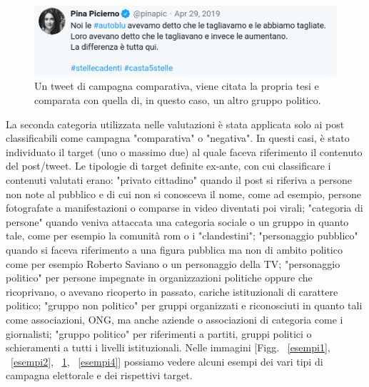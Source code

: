 \begin{figure}
	\includegraphics[width=\linewidth]{figures/comparativa}
	\caption{Un tweet di campagna comparativa, viene citata la propria tesi e comparata con quella di, in questo caso, un altro gruppo politico.}
	\label{esempi3}
\end{figure}
La seconda categoria utilizzata nelle valutazioni è stata applicata solo ai post classificabili come campagna "comparativa" o "negativa". In questi casi, è stato individuato il target (uno o massimo due) al quale faceva riferimento il contenuto del post/tweet. Le tipologie di target definite ex-ante, con cui classificare i contenuti valutati erano:  "privato cittadino" quando il post si riferiva a persone non note al pubblico e di cui non si conosceva il nome, come ad esempio, persone fotografate a manifestazioni o comparse in video diventati poi virali; "categoria di persone" quando veniva attaccata una categoria sociale o un gruppo in quanto tale, come per esempio la comunità rom o i "clandestini"; "personaggio pubblico" quando si faceva riferimento a una figura pubblica ma non di ambito politico come per esempio Roberto Saviano o un personaggio della TV; "personaggio politico" per persone impegnate in organizzazioni politiche oppure che ricoprivano, o avevano ricoperto in passato, cariche istituzionali di carattere politico; "gruppo non politico" per gruppi organizzati e riconosciuti in quanto tali come associazioni, ONG, ma anche aziende o associazioni di categoria come i giornalisti; "gruppo politico" per riferimenti a partiti, gruppi politici o schieramenti a tutti i livelli istituzionali. Nelle immagini [Figg. ~\ref{esempi1}, ~\ref{esempi2}, ~\ref{esempi3}, ~\ref{esempi4}] possiamo vedere alcuni esempi dei vari tipi di campagna elettorale e dei rispettivi target.


